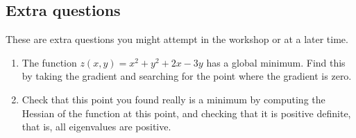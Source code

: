 \documentclass[11pt,a4paper]{scrartcl}
\begin{document}
\subsection*{Extra questions}

These are extra questions you might attempt in the workshop or at a later time.

\begin{enumerate}
\item The function $z(x, y) = x^2 + y^2 + 2x - 3y$ has a global minimum. Find this by taking
the gradient and searching for the point where the gradient is zero.
\item Check that this point you found really is a minimum by computing the Hessian of the
function at this point, and checking that it is positive definite, that is, all eigenvalues are positive.


\end{enumerate}
\end{document}
